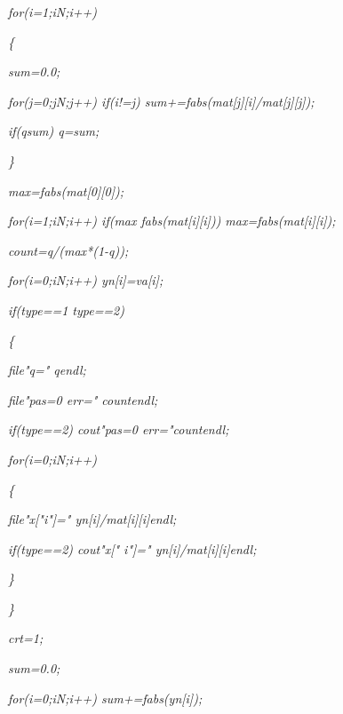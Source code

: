 \documentclass[a4paper,twoside]{book}
\begin{document}
\textit{\qquad for(i=1;i\TEXTsymbol{<}N;i++)}

\textit{\qquad \{}

\textit{\qquad \qquad sum=0.0;}

\textit{\qquad \qquad for(j=0;j\TEXTsymbol{<}N;j++) if(i!=j)
sum+=fabs(mat[j][i]/mat[j][j]);}

\textit{\qquad \qquad if(q\TEXTsymbol{<}sum) q=sum;}

\textit{\qquad \}}

\textit{\qquad max=fabs(mat[0][0]);}

\textit{\qquad for(i=1;i\TEXTsymbol{<}N;i++) if(max\TEXTsymbol{>}%
fabs(mat[i][i])) max=fabs(mat[i][i]);}

\textit{\qquad count=q/(max*(1-q));}

\textit{\qquad for(i=0;i\TEXTsymbol{<}N;i++) yn[i]=va[i];}

\textit{\qquad if(type==1 \TEXTsymbol{\vert}\TEXTsymbol{\vert} type==2)}

\textit{\qquad \{}

\textit{\qquad \qquad file\TEXTsymbol{<}\TEXTsymbol{<}"q="\TEXTsymbol{<}%
\TEXTsymbol{<}q\TEXTsymbol{<}\TEXTsymbol{<}endl;}

\textit{\qquad \qquad file\TEXTsymbol{<}\TEXTsymbol{<}"pas=0 err="%
\TEXTsymbol{<}\TEXTsymbol{<}count\TEXTsymbol{<}\TEXTsymbol{<}endl;}

\textit{\qquad \qquad if(type==2) cout\TEXTsymbol{<}\TEXTsymbol{<}"pas=0
err="\TEXTsymbol{<}\TEXTsymbol{<}count\TEXTsymbol{<}\TEXTsymbol{<}endl;}

\textit{\qquad \qquad for(i=0;i\TEXTsymbol{<}N;i++)}

\textit{\qquad \qquad \{}

\textit{\qquad \qquad \qquad file\TEXTsymbol{<}\TEXTsymbol{<}"x["\TEXTsymbol{%
<}\TEXTsymbol{<}i\TEXTsymbol{<}\TEXTsymbol{<}"]="\TEXTsymbol{<}\TEXTsymbol{<}%
yn[i]/mat[i][i]\TEXTsymbol{<}\TEXTsymbol{<}endl;}

\textit{\qquad \qquad \qquad if(type==2) cout\TEXTsymbol{<}\TEXTsymbol{<}"x["%
\TEXTsymbol{<}\TEXTsymbol{<}i\TEXTsymbol{<}\TEXTsymbol{<}"]="\TEXTsymbol{<}%
\TEXTsymbol{<}yn[i]/mat[i][i]\TEXTsymbol{<}\TEXTsymbol{<}endl;}

\textit{\qquad \qquad \}}

\textit{\qquad \}}

\textit{\qquad crt=1;}

\textit{\qquad sum=0.0;}

\textit{\qquad for(i=0;i\TEXTsymbol{<}N;i++) sum+=fabs(yn[i]);}
\end{document}

